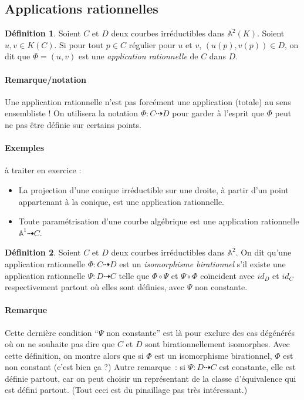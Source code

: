 \documentclass[a4paper, 11pt]{article}
\theoremstyle{definition}
\newtheorem{définition}{Définition}
\newcommand{\aff}{\mathbb{A}}
\begin{document}
\subsection{Applications rationnelles}

\begin{définition}
  Soient $C$ et $D$ deux courbes irréductibles dans
  $\aff^2(K)$. Soient $u, v \in K(C)$. Si pour tout $p \in C$ régulier
  pour $u$ et $v$, $(u(p), v(p)) \in D$, on dit que $\Phi = (u,v)$ est
  une \emph{application rationnelle} de $C$ dans $D$.
\end{définition}
\paragraph{Remarque/notation} Une application rationnelle n'est pas
forcément une application (totale) au sens ensembliste ! On utilisera
la notation $\Phi : C \dashrightarrow D$ pour garder à l'esprit que
$\Phi$ peut ne pas être définie sur certains points.

\paragraph{Exemples} à traiter en exercice :
\begin{itemize}
\item La projection d'une conique irréductible sur une droite, à
  partir d'un point appartenant à la conique, est une application
  rationnelle.
\item Toute paramétrisation d'une courbe algébrique est une
  application rationnelle $\aff^1 \dashrightarrow C$.
\end{itemize}

\begin{définition}
  Soient $C$ et $D$ deux courbes irréductibles dans $\aff^2$. On dit
  qu'une application rationnelle $\Phi : C \dashrightarrow D$ est un
  \emph{isomorphisme birationnel} s'il existe une application
  rationnelle $\Psi : D \dashrightarrow C$ telle que $\Phi \circ \Psi$
  et $\Psi \circ \Phi$ coïncident avec $id_D$ et $id_C$ respectivement
  partout où elles sont définies, avec $\Psi$ non constante.
\end{définition}
\paragraph{Remarque} Cette dernière condition \enquote{$\Psi$ non
  constante} est là pour exclure des cas dégénérés où on ne souhaite
pas dire que $C$ et $D$ sont birationnellement isomorphes. Avec cette
définition, on montre alors que si $\Phi$ est un isomorphisme
birationnel, $\Phi$ est non constant (c'est bien ça ?) Autre
remarque~: si $\Psi : D \dashrightarrow C$ est constante, elle est
définie partout, car on peut choisir un représentant de la classe
d'équivalence qui est défini partout. (Tout ceci est du pinaillage pas
très intéressant.)
\end{document}
